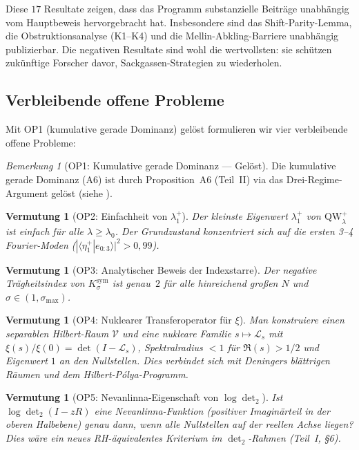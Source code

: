 \documentclass[12pt,a4paper]{article}
\newtheorem{conjecture}[theorem]{Vermutung}
\theoremstyle{definition}
\theoremstyle{remark}
\newtheorem{remark}[theorem]{Bemerkung}
\newcommand{\Ksym}{K_\sigma^{\mathrm{sym}}}
\begin{document}
\noindent Diese $17$ Resultate zeigen, dass das Programm substanzielle Beiträge unabhängig vom Hauptbeweis hervorgebracht hat. Insbesondere sind das Shift-Parity-Lemma, die Obstruktionsanalyse (K1--K4) und die Mellin-Abkling-Barriere unabhängig publizierbar. Die negativen Resultate sind wohl die wertvollsten: sie schützen zukünftige Forscher davor, Sackgassen-Strategien zu wiederholen.


\subsection{Verbleibende offene Probleme}

Mit OP1 (kumulative gerade Dominanz) gelöst formulieren wir vier verbleibende offene Probleme:

\begin{remark}[OP1: Kumulative gerade Dominanz --- Gelöst]
\label{rem:OP1-resolved}
Die kumulative gerade Dominanz (A6) ist durch Proposition~A6 (Teil~II) via das Drei-Regime-Argument gelöst (siehe ).
\end{remark}

\begin{conjecture}[OP2: Einfachheit von $\lambda_1^+$]
\label{conj:OP2}
Der kleinste Eigenwert $\lambda_1^+$ von $\mathrm{QW}_\lambda^+$ ist einfach für alle $\lambda \geq \lambda_0$. Der Grundzustand konzentriert sich auf die ersten 3--4 Fourier-Moden ($|\langle \eta_1^+ | e_{0:3} \rangle|^2 > 0{,}99$).
\end{conjecture}

\begin{conjecture}[OP3: Analytischer Beweis der Indexstarre]
\label{conj:OP3}
Der negative Trägheitsindex von $\Ksym$ ist genau~$2$ für alle hinreichend großen $N$ und $\sigma \in (1, \sigma_{\max})$.
\end{conjecture}

\begin{conjecture}[OP4: Nuklearer Transferoperator für $\xi$]
\label{conj:OP4}
Man konstruiere einen separablen Hilbert-Raum $\mathcal{V}$ und eine nukleare Familie $s \mapsto \mathcal{L}_s$ mit $\xi(s)/\xi(0) = \det(I - \mathcal{L}_s)$, Spektralradius $< 1$ für $\Re(s) > 1/2$ und Eigenwert $1$ an den Nullstellen. Dies verbindet sich mit Deningers blättrigen Räumen und dem Hilbert-P\'olya-Programm.
\end{conjecture}

\begin{conjecture}[OP5: Nevanlinna-Eigenschaft von $\log\det_2$]
\label{conj:OP5}
Ist $\log\det_2(I - zR)$ eine Nevanlinna-Funktion (positiver Imaginärteil in der oberen Halbebene) genau dann, wenn alle Nullstellen auf der reellen Achse liegen? Dies wäre ein neues RH-äquivalentes Kriterium im $\det_2$-Rahmen (Teil~I, \S6).
\end{conjecture}
\end{document}
